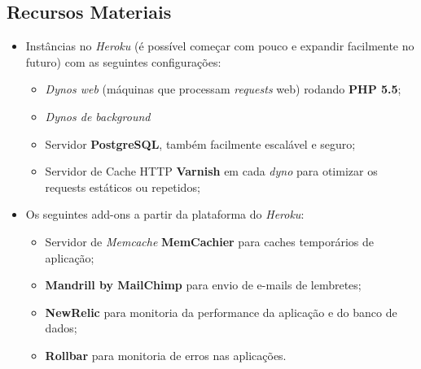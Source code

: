 \documentclass[a4paper]{abnt}
\begin{document}
\subsection*{Recursos Materiais}
\begin{itemize}
	\item Instâncias no \emph{Heroku} (é possível começar com pouco e expandir facilmente no futuro\cite{heroku}) com as seguintes configurações:
	\begin{itemize}
		\item \emph{Dynos web} (máquinas que processam \emph{requests} web) rodando \textbf{PHP 5.5};
		\item \emph{Dynos de background} 
		\item Servidor \textbf{PostgreSQL}, também facilmente escalável e seguro\cite{heroku-pgsql};
		\item Servidor de Cache HTTP \textbf{Varnish} em cada \emph{dyno} para otimizar os requests estáticos ou repetidos;
	\end{itemize}
	
	\item Os seguintes add-ons a partir da plataforma do \emph{Heroku}:
	\begin{itemize}
		\item Servidor de \emph{Memcache} \textbf{MemCachier} para caches temporários de aplicação;
		\item \textbf{Mandrill by MailChimp} para envio de e-mails de lembretes;
		\item \textbf{NewRelic} para monitoria da performance da aplicação e do banco de dados;
		\item \textbf{Rollbar} para monitoria de erros nas aplicações.
	\end{itemize}
\end{itemize}

\end{document}
